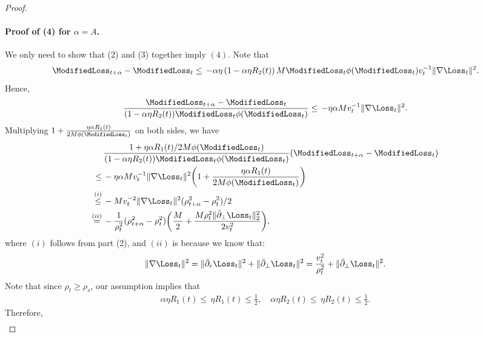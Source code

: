 \begin{proof}
    \paragraph{Proof of (4) for $\alpha = A$.} We only need to show that (2) and (3) together imply $(4)$. 
    Note that 
    \[
        \ModifiedLoss_{t+\alpha} - \ModifiedLoss_t \le \, - \alpha \eta \left( 1- \alpha \eta R_2 (t) \right) M \ModifiedLoss_t \phi (\ModifiedLoss_t) v_t^{-1} \|\nabla \Loss_t\|^2. 
    \] 
    Hence,  
    \begin{align*}
        \frac{\ModifiedLoss_{t+\alpha}  - \ModifiedLoss_t}{(1- \alpha \eta R_2 (t)) \ModifiedLoss_t \phi(\ModifiedLoss_t)} \le \, - \eta \alpha M v_t^{-1}  \|\nabla \Loss_t\|^2. 
    \end{align*}
    Multiplying $1+ \frac{\eta \alpha R_1 (t) }{2M \phi(\ModifiedLoss_t)}$ on both sides, we have
    \begin{align*}
        & \frac{1+ \eta \alpha R_1 (t) / 2M \phi(\ModifiedLoss_t)}{(1- \alpha \eta R_2 (t) ) \ModifiedLoss_t \phi(\ModifiedLoss_t)} (\ModifiedLoss_{t+\alpha}  - \ModifiedLoss_t) \\
        \le \, & - \eta \alpha M  v_t^{-1}  \|\nabla \Loss_t\|^2 \bigg ( 1+ \frac{\eta \alpha R_1 (t) }{2M \phi(\ModifiedLoss_t)} \bigg) \\ 
        \stackrel{(i)}{\le} \, & - M v_t^{-2}  \|\nabla \Loss_t\|^2 (\rho_{t+\alpha}^2 - \rho_t^2) /2 \\ 
        \stackrel{(ii)}{=} \, & - \frac{1}{\rho_t^2}(\rho_{t+\alpha}^2 - \rho_t^2)   \bigg( \frac{M}{2}+  \frac{M\rho_t^2\| \bar \partial_\perp \Loss_t\|_2^2}{2v_t^2} \bigg),
    \end{align*}
    where $(i)$ follows from part (2), and $(ii)$ is because we know that: 
    \[
        \|\nabla \Loss_t \|^2 = \| \bar \partial_r \Loss_t\|^2 + \| \bar \partial_\perp \Loss_t\|^2  =  \frac{v_t^2}{\rho_t^2} + \| \bar \partial_\perp \Loss_t\|^2. 
    \] 
    Note that since $\rho_t \ge \rho_s$, our assumption implies that
    \begin{align*}
        \alpha \eta R_1 (t) \le \, \eta R_1 (t) \le \frac{1}{2}, \quad \alpha \eta R_2 (t) \le \, \eta R_2 (t) \le \frac{1}{2}.
    \end{align*}
    Therefore,
    \begin{align*}

\end{align*}
\end{proof}
